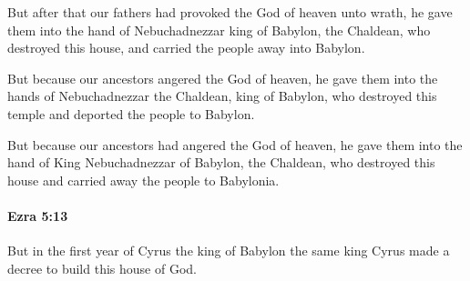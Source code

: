 			\begin{versebox}
					\item[BHS] 
					\item[LXX] 
					\item[ASV] But after that our fathers had provoked the God of heaven unto wrath, he gave them into the hand of Nebuchadnezzar king of Babylon, the Chaldean, who destroyed this house, and carried the people away into Babylon.
					\item[NIV] But because our ancestors angered the God of heaven, he gave them into the hands of Nebuchadnezzar the Chaldean, king of Babylon, who destroyed this temple and deported the people to Babylon.
					\item[NRSV] But because our ancestors had angered the God of heaven, he gave them into the hand of King Nebuchadnezzar of Babylon, the Chaldean, who destroyed this house and carried away the people to Babylonia.
			\end{versebox}

		\paragraph{Ezra 5:13} %
			\label{EZRA-5-13}

			But in the first year of Cyrus the king of Babylon the same king Cyrus made a decree to build this house of God.

